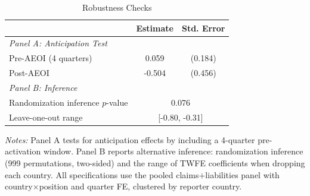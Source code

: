 \begin{table}[t]
\centering
\caption{Robustness Checks}
\label{tab:robustness}
\begin{tabular}{lcc}
\hline\hline
 & Estimate & Std. Error \\
\hline
\multicolumn{3}{l}{\textit{Panel A: Anticipation Test}} \\
Pre-AEOI (4 quarters) & 0.059 & (0.184) \\
Post-AEOI & -0.504 & (0.456) \\
\hline
\multicolumn{3}{l}{\textit{Panel B: Inference}} \\
Randomization inference $p$-value & \multicolumn{2}{c}{0.076} \\
Leave-one-out range & \multicolumn{2}{c}{[-0.80, -0.31]} \\
\hline\hline
\end{tabular}
\begin{tablenotes}
\item \textit{Notes:} Panel A tests for anticipation effects by including a 4-quarter pre-activation window. Panel B reports alternative inference: randomization inference (999 permutations, two-sided) and the range of TWFE coefficients when dropping each country. All specifications use the pooled claims$+$liabilities panel with country$\times$position and quarter FE, clustered by reporter country.
\end{tablenotes}
\end{table}


